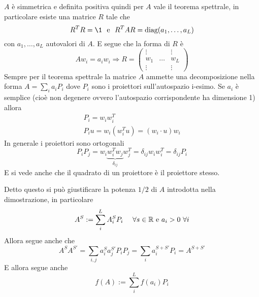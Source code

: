 \documentclass[Main.tex]{subfiles}
\begin{document}
\begin{dm}
\begin{osservazione}
	$A$ è simmetrica e definita positiva quindi per $A$ vale il teorema spettrale, in particolare esiste una matrice $R$ tale che 
	\begin{equation}
		R^TR= \1 \ \ \text{e} \ \ R^TAR = \text{diag}(a_1, \dots , a_L)
	\end{equation}
	con $a_1, \dots , a_L$ autovalori di $A$. E segue che la forma di $R$ è
	\begin{equation}
		A w_i =a_i w_i \Longrightarrow R= \left( \begin{matrix}
 	\vdots &&  \vdots \\
 	w_1 & \dots & w_L \\
 	\vdots & & \vdots 
 \end{matrix}\right)
	\end{equation}
	Sempre per il teorema spettrale la matrice $A$ ammette una decomposizione nella forma $A= \sum_i a_i P_i$ dove $P_i$ sono i proiettori sull'autospazio i-esimo.  Se $a_i$ è semplice (cioè non degenere ovvero l'autospazio corrispondente ha dimensione 1) allora 
	\begin{gather}
		P_i =w_i w_i^T\\
		P_iu= w_i (w_i^Tu) = (w_i \cdot u ) w_i
	\end{gather}
	In generale i proiettori sono ortogonali 
	\begin{equation}
 		 P_iP_j=w_i \underbrace{w_i^T w_j}_{\delta_{ij}}w_j^T = \delta_{ij} w_i w_i^T = \delta_{ij} P_i
	\end{equation}
	E si vede anche che il quadrato di un proiettore è il proiettore stesso.
	
	Detto questo si può giustificare la potenza $1/2$ di $A$ introdotta nella dimostrazione, in particolare
	\begin{equation}
		A^S : = \sum_{i}^L A_i^S P_i \ \ \ \  \forall s \in \mathbb{R} \text{ e } a_i >0 \ \forall i
	\end{equation}
	Allora segue anche che
	\begin{equation}
		A^S A^{S'} = \sum_{i,j} a_i^S a_j^{S'} P_i P_j = \sum_ i a_i^{S+S'} P_i = A^{S+S'}
	\end{equation}
	E allora segue anche
	\begin{equation}
		f(A) := \sum_i^L f(a_i) P_i
	\end{equation}
	\end{osservazione}
\end{dm}
\end{document}
